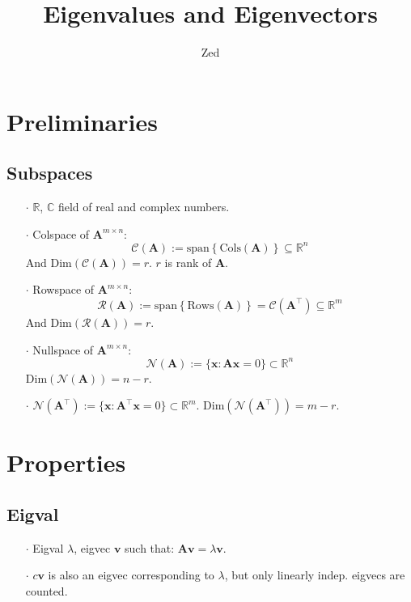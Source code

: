 \documentclass[a4paper, 11pt]{article}
\title{\textbf{Eigenvalues and Eigenvectors}}
\author{Zed}
\begin{document}
\maketitle




\section{Preliminaries}
\subsection{Subspaces}
\begin{itemize}
  \item[$\cdot$] $\mathbb{R}$, $\mathbb{C}$ field of real and complex numbers.
  \item[$\cdot$] Colspace of $\pmb{A}^{m\times n}$: 
  $$
  \mathcal{C}(\pmb{A}):=\text{span}\left\{\text{Cols}(\pmb{A})\right\}\subseteq \mathbb{R}^n
  $$
  And $\text{Dim}(\mathcal{C}(\pmb{A}))=r$. $r$ is rank of $\pmb{A}$.

  \item[$\cdot$] Rowspace of $\pmb{A}^{m\times n}$: 
  $$
  \mathcal{R}(\pmb{A}):=\text{span}\left\{\text{Rows}(\pmb{A})\right\}=\mathcal{C}(\pmb{A}^{\top})\subseteq \mathbb{R}^m
  $$ 
  And $\text{Dim}(\mathcal{R}(\pmb{A}))=r$.

  \item[$\cdot$] Nullspace of $\pmb{A}^{m\times n}$: 
  $$
  \mathcal{N}(\pmb{A}):=\{\pmb{x}: \pmb{Ax}=0\}\subset \mathbb{R}^n
  $$ 
  $\text{Dim}(\mathcal{N}(\pmb{A}))=n-r$.

  \item[$\cdot$] $\mathcal{N}(\pmb{A}^{\top}):=\{\pmb{x}: \pmb{\pmb{A}^{\top}x}=0\}\subset \mathbb{R}^m$. $\text{Dim}(\mathcal{N}(\pmb{A}^{\top}))=m-r$.
\end{itemize}




\section{Properties}
\subsection{Eigval}
\begin{itemize}
  \item[$\cdot$] Eigval $\lambda$, eigvec $\pmb{v}$ such that: $\pmb{A} \pmb{v} = \lambda \pmb{v}$.
  \item[$\cdot$]$c \pmb{v}$ is also an eigvec corresponding to $\lambda$, but only linearly indep. eigvecs are counted.
\end{itemize}
\end{document}
